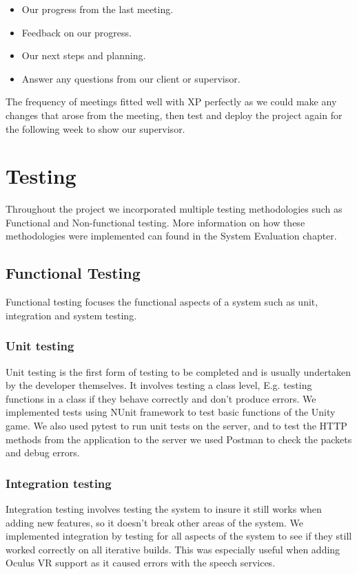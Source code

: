 \begin{itemize}
  \item Our progress from the last meeting.
  \item Feedback on our progress.
  \item Our next steps and planning.
  \item Answer any questions from our client or supervisor. 
\end{itemize}

The frequency of meetings fitted well with XP perfectly as we could make any changes that arose from the meeting, then test and deploy the project again for the following week to show our supervisor.

\section{Testing}
Throughout the project we incorporated multiple testing methodologies such as Functional and Non-functional testing. More information on how these methodologies were implemented can found in the System Evaluation chapter.

\subsection{Functional Testing}
Functional testing focuses the functional aspects of a system such as unit, integration and system testing.

\subsubsection{Unit testing}
Unit testing is the first form of testing to be completed and is usually undertaken by the developer themselves. It involves testing a class level, E.g. testing functions in a class if they behave correctly and don't produce errors. We implemented tests using NUnit framework to test basic functions of the Unity game. We also used pytest to run unit tests on the server, and to test the HTTP methods from the application to the server we used Postman to check the packets and debug errors.

\subsubsection{Integration testing}
Integration testing involves testing the system to insure it still works when adding new features, so it doesn't break other areas of the system. We implemented integration by testing for all aspects of the system to see if they still worked correctly on all iterative builds. This was especially useful when adding Oculus VR support as it caused errors with the speech services.

